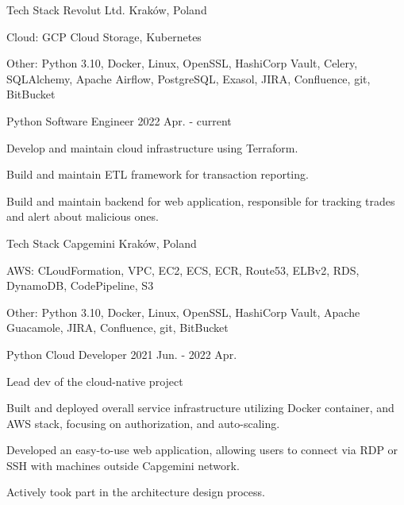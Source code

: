 

\begin{cventries}

  \cventrytwopositions
    {Tech Stack} %
    {Revolut Ltd.} %
    {Kraków, Poland} %
    {}
    {
      \begin{cvitems}
        \item {Cloud: GCP Cloud Storage, Kubernetes}
        \item {Other: Python 3.10, Docker, Linux, OpenSSL, HashiCorp Vault, Celery, SQLAlchemy, Apache Airflow, PostgreSQL, Exasol, JIRA, Confluence, git, BitBucket}
      \end{cvitems}
    }
    {Python Software Engineer} %
    {2022 Apr. - current} %
    {
      \begin{cvitems} %
        \item {Develop and maintain cloud infrastructure using Terraform.}
        \item {Build and maintain ETL framework for transaction reporting.}
        \item {Build and maintain backend for web application, responsible for tracking trades and alert about malicious ones.}
      \end{cvitems}
    }

  \cventrytwopositions
    {Tech Stack} %
    {Capgemini} %
    {Kraków, Poland} %
    {}
    {
      \begin{cvitems}
        \item {AWS: CLoudFormation, VPC, EC2, ECS, ECR, Route53, ELBv2, RDS, DynamoDB, CodePipeline, S3}
        \item {Other: Python 3.10, Docker, Linux, OpenSSL, HashiCorp Vault, Apache Guacamole, JIRA, Confluence, git, BitBucket}
      \end{cvitems}
    }
    {Python Cloud Developer} %
    {2021 Jun. - 2022 Apr.} %
    {
      \begin{cvitems} %
        \item {Lead dev of the cloud-native project}
        \item {Built and deployed overall service infrastructure utilizing Docker container, and AWS stack, focusing on authorization, and auto-scaling.}
        \item {Developed an easy-to-use web application, allowing users to connect via RDP or SSH with machines outside Capgemini network.}
        \item {Actively took part in the architecture design process.}
      \end{cvitems}
    }


\end{cventries}
